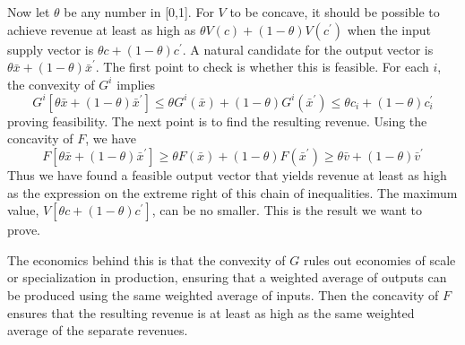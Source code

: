 Now let $\theta$ be any number in [0,1]. For $V$ to be concave, it should be possible to achieve revenue at least as high as $\theta V(c) + (1-\theta)V(c^\prime)$ when the input supply vector is $\theta c + (1-\theta)c^\prime$. A natural candidate for the output vector is $\theta \bar{x} + (1-\theta) \bar{x}^\prime$. The first point to check is whether this is feasible. For each $i$, the convexity of $G^i$ implies
\begin{equation*}
G^i[\theta \bar{x} +(1-\theta)\bar{x}^\prime] \leq \theta G^i(\bar{x}) + (1-\theta) G^i(\bar{x}^\prime) \leq \theta c_i + (1-\theta)c_i^\prime
\end{equation*}
proving feasibility. The next point is to find the resulting revenue. Using the concavity of $F$, we have
\begin{equation*}
F[\theta \bar{x} + (1-\theta) \bar{x}^\prime ] \geq \theta F(\bar{x}) + (1-\theta)F(\bar{x}^\prime) \geq \theta \bar{v} + (1-\theta)\bar{v}^\prime
\end{equation*}
Thus we have found a feasible output vector that yields revenue at least as high as the expression on the extreme right of this chain of inequalities. The maximum value, $V[\theta c +(1-\theta) c^\prime]$, can be no smaller. This is the result we want to prove.

The economics behind this is that the convexity of $G$ rules out economies of scale or specialization in production, ensuring that a weighted average of outputs can be produced using the same weighted average of inputs. Then the concavity of $F$ ensures that the resulting revenue is at least as high as the same weighted average of the separate revenues.

